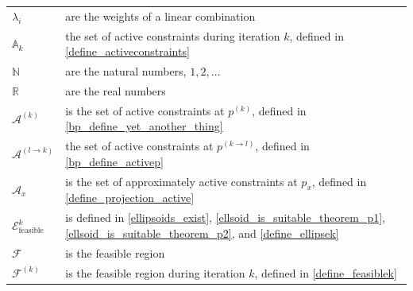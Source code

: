 \documentclass{article}
\theoremstyle{case}
\newcommand{\activeconstraintsk}{{\mathbb A_{k}}}
\newcommand{\feasiblek}{{\mathcal F^{(k)}}}
\newcommand{\feasible}{{\mathcal F}}
\newcommand{\naturals}{\mathbb N}
\newcommand{\reals}{\mathbb R}
\newcommand{\unshiftedellipsoid}{{\mathcal E^k_{\text{feasible}}}}
\begin{document}
\begin{longtable}{| p{} | p{} |}
$\lambda_i$ & are the weights of a linear combination \\ %
$\activeconstraintsk$ & the set of active constraints during iteration $k$, defined in \cref{define_activeconstraints} \\ %
$\naturals $ & are the natural numbers, $1, 2, \ldots$ \\ %
$\reals $ & are the real numbers \\ %
$\mathcal A^{(k)}$ & is the set of active constraints at $p^{(k)}$, defined in \cref{bp_define_yet_another_thing} \\ %
$\mathcal A^{(l \to k)}$ & the set of active constraints at $p^{(k \to l)}$, defined in \cref{bp_define_activep} \\ %
$\mathcal A_x$ & is the set of approximately active constraints at $p_x$, defined in \cref{define_projection_active} \\ %
$\unshiftedellipsoid$ & is defined in \cref{ellipsoids_exist}, \cref{ellsoid_is_suitable_theorem_p1}, \cref{ellsoid_is_suitable_theorem_p2}, and \cref{define_ellipsek} \\ %
$\feasible$ & is the feasible region \\ %
$\feasiblek$ & is the feasible region during iteration $k$, defined in \cref{define_feasiblek} \\ %

\end{longtable}
\end{document}
